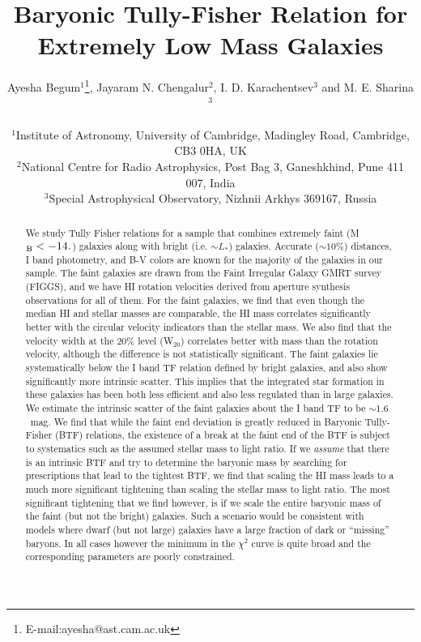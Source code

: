 \documentclass[useAMS,usenatbib]{mn2e}
\title[BTF Relation for Extremely Low Mass Galaxies]{Baryonic Tully-Fisher Relation for Extremely Low Mass Galaxies}
\author[Begum et al.]
{
Ayesha Begum$^{1}$\thanks{E-mail:ayesha@ast.cam.ac.uk},
Jayaram N. Chengalur$^{2}$, 
I. D. Karachentsev$^{3}$ and
M. E. Sharina$^{3}$
\\
\\
$^{1}$Institute of Astronomy, University of Cambridge, Madingley Road, Cambridge, CB3 0HA, UK\\
$^{2}$National Centre for Radio Astrophysics, Post Bag 3, Ganeshkhind, Pune 411 007, India\\
$^{3}$Special Astrophysical Observatory, Nizhnii Arkhys 369167, Russia\\
}
\begin{document}
\date{}


\maketitle

\label{firstpage}

\begin{abstract}
  We study Tully Fisher relations for a sample that combines extremely faint (M$_{\rm B} < -14.$) galaxies along with bright (i.e. $\sim L_{*}$) galaxies. Accurate ($\sim 10\%$) distances, I band photometry, and B-V colors are known for the majority of the galaxies in our sample. The faint galaxies are drawn from the Faint Irregular Galaxy GMRT survey (FIGGS), and we have HI rotation velocities derived from aperture synthesis observations for all of them. For the faint galaxies, we find that even though the median HI and stellar masses are  comparable, the HI mass correlates significantly better with the circular velocity indicators than the stellar mass. We also find  that the velocity width at the 20\% level (W$_{20}$) correlates better with mass than the rotation velocity, although the difference is not statistically significant. The faint galaxies lie systematically below the I band TF relation defined by bright galaxies, and also show significantly more intrinsic scatter. This implies that the integrated star formation in these galaxies has been both less efficient and also less regulated than in large galaxies. We estimate the intrinsic scatter of the faint galaxies about the I band TF to be $\sim 1.6$~mag. We find that while the faint end deviation is greatly reduced in Baryonic Tully-Fisher (BTF) relations, the existence of a break at the faint end of the BTF is subject to systematics such as the assumed stellar mass to light ratio. If we {\it assume} that there is an intrinsic BTF and try to determine the baryonic mass by searching for prescriptions that lead to the tightest BTF, we find that scaling the HI mass leads to a much more significant tightening than scaling the stellar mass to light ratio. The most significant tightening that we find however, is if we scale the entire baryonic mass of the faint (but not the bright) galaxies. Such a scenario would be consistent with models where dwarf (but not large) galaxies have a large fraction of dark or ``missing'' baryons. In all cases however the minimum in the $\chi^2$ curve is quite broad and the corresponding parameters are poorly constrained.
\end{abstract}
\end{document}
